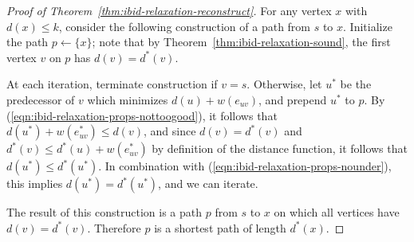 \begin{proof}[Proof of Theorem~\ref{thm:ibid-relaxation-reconstruct}]
For any vertex $x$ with $d(x) \leq k$,
consider the following construction of a path from $s$ to $x$.
Initialize the path $p \leftarrow \{ x \}$;
note that by Theorem~\ref{thm:ibid-relaxation-sound},
the first vertex $v$ on $p$ has $d(v) = d^*(v)$.

At each iteration, terminate construction if $v=s$.
Otherwise,
let $u^*$ be the predecessor of $v$ which minimizes
$d(u) + w(e_{uv})$,
and prepend $u^*$ to $p$.
By (\ref{eqn:ibid-relaxation-props-nottoogood}),
it follows that $d(u^*) + w(e_{uv}^*) \leq d(v)$,
and since $d(v) = d^*(v)$ and
$d^*(v) \leq d^*(u) + w(e_{uv}^*)$
by definition of the distance function,
it follows that $d(u^*) \leq d^*(u^*)$.
In combination with (\ref{eqn:ibid-relaxation-props-nounder}),
this implies $d(u^*) = d^*(u^*)$,
and we can iterate.

The result of this construction is a path $p$ from $s$ to $x$
on which all vertices have $d(v) = d^*(v)$.
Therefore $p$ is a shortest path of length $d^*(x)$.
\end{proof}


